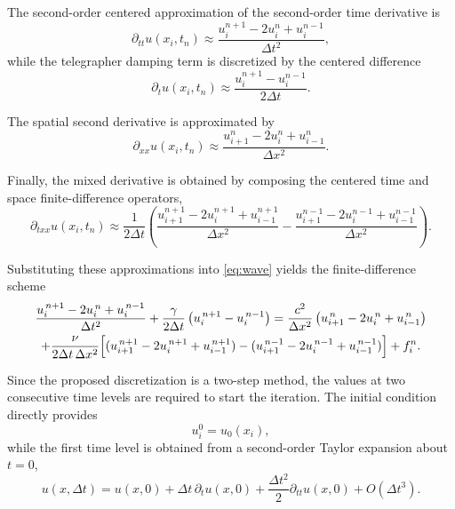 \documentclass{Configuration_Files/PoliMi3i_thesis}
\begin{document}
The second-order centered approximation of the second-order time derivative is
\begin{equation*}
\partial_{tt}u(x_i,t_n)
\approx
\frac{u_i^{n+1}-2u_i^n+u_i^{n-1}}{\Delta t^2},
\end{equation*}
while the telegrapher damping term is discretized by the centered difference
\begin{equation*}
\partial_tu(x_i,t_n)
\approx
\frac{u_i^{n+1}-u_i^{n-1}}{2\Delta t}.
\end{equation*}

The spatial second derivative is approximated by
\begin{equation*}
\partial_{xx}u(x_i,t_n)
\approx
\frac{u_{i+1}^n-2u_i^n+u_{i-1}^n}{\Delta x^2}.
\end{equation*}

Finally, the mixed derivative is obtained by composing the centered time and space finite-difference operators,
\begin{equation*}
\partial_{txx}u(x_i,t_n)
\approx
\frac{1}{2\Delta t}
\left(
\frac{u_{i+1}^{n+1}-2u_i^{n+1}+u_{i-1}^{n+1}}{\Delta x^2}
-
\frac{u_{i+1}^{n-1}-2u_i^{n-1}+u_{i-1}^{n-1}}{\Delta x^2}
\right).
\end{equation*}

Substituting these approximations into \eqref{eq:wave} yields the finite-difference scheme
\begin{multline}
    \frac{u_i^{\,n+1}-2u_i^{\,n}+u_i^{\,n-1}}{\Delta t^{2}}
    +\frac{\gamma}{2\Delta t}\left(u_i^{\,n+1}-u_i^{\,n-1}\right)
    =
    \frac{c^{2}}{\Delta x^{2}}
    \left(
    u_{i+1}^{\,n}-2u_i^{\,n}+u_{i-1}^{\,n}
    \right)
    \\
    +
    \frac{\nu}{2\Delta t\,\Delta x^{2}}
    \Bigl[
    (u_{i+1}^{\,n+1}-2u_i^{\,n+1}+u_{i-1}^{\,n+1})
    -
    (u_{i+1}^{\,n-1}-2u_i^{\,n-1}+u_{i-1}^{\,n-1})
    \Bigr]
    +f_i^n.
    \label{eq:fdtd_scalar}
\end{multline}

Since the proposed discretization is a two-step method, the values at two consecutive time levels are required to start the iteration. The initial condition directly provides
\begin{equation*}
u_i^0=u_0(x_i),
\end{equation*}
while the first time level is obtained from a second-order Taylor expansion about \(t=0\),
\begin{equation*}
u(x,\Delta t)
=
u(x,0)
+
\Delta t\,\partial_tu(x,0)
+
\frac{\Delta t^2}{2}\partial_{tt}u(x,0)
+
O(\Delta t^3).
\end{equation*}
\end{document}

